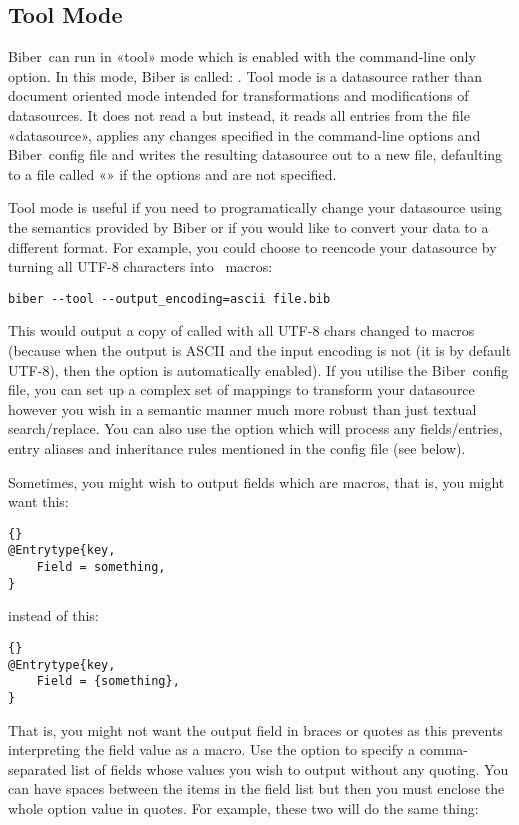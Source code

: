 \documentclass{ltxdockit}
\newcommand*{\biber}{Biber\xspace}
\begin{document}
\subsection{Tool Mode}\label{ref:tool}
\biber\ can run in «tool» mode which is enabled with the 
command-line only option. In this mode, \biber is called: . Tool mode is a datasource rather than document oriented
mode intended for transformations and modifications of datasources. It does
not read a  but instead, it reads all entries from the file
«datasource», applies any changes specified in the command-line options and
\biber\ config file and writes the resulting datasource out to a new file,
defaulting to a \bibtex file called «» if
the options  and  are not specified.

Tool mode is useful if you need to programatically change your datasource
using the semantics provided by \biber or if you would like to convert your
data to a different format. For example, you could choose to reencode your
datasource by turning all UTF-8 characters into \latex\ macros:

\begin{verbatim}
biber --tool --output_encoding=ascii file.bib
\end{verbatim}

\noindent This would output a copy of  called  with all
UTF-8 chars changed to \latex macros (because when the output is ASCII and
the input encoding is not (it is by default UTF-8), then the
 option is automatically enabled). If you utilise the \biber\
config file, you can set up a complex set of mappings to transform
your datasource however you wish in a semantic manner much more robust
than just textual search/replace. You can also use the
 option which will process any 
fields/entries, entry aliases and inheritance rules mentioned in the config
file (see below).

Sometimes, you might wish to output fields which are \bibtex macros,
that is, you might want this:

\begin{lstlisting}[style=bibtex, columns=fixed]{}
@Entrytype{key,
    Field = something,
}
\end{lstlisting}
%
instead of this:
\begin{lstlisting}[style=bibtex, columns=fixed]{}
@Entrytype{key,
    Field = {something},
}
\end{lstlisting}
%
That is, you might not want the output field in braces or quotes as
this prevents \bibtex interpreting the field value as a macro. Use the
\opt{--output-macro-fields} option to specify a comma-separated list
of fields whose values you wish to output without any \bibtex
quoting. You can have spaces between the items in the field list but
then you must enclose the whole option value in quotes. For example,
these two will do the same thing:
\end{document}
